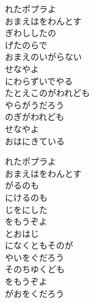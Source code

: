 \documentclass[10pt,b5j]{tarticle} %
\begin{document}
\vspace{1.5em} %
\newcommand{\linespace}{0.5em} %
\newcommand{\blocksize}{0.5\hsize} %
\begin{enumerate} %
    \begin{minipage}[c]{\blocksize}
    
        \vspace{\linespace}
        \item
        れたポプラよ\\
        おまえはをわんとす\\
        ぎわししたの\\
        げたのらで\\
        おまえのいがらない\\
        せなやよ\\
        にわらずいでやる\\
        たとえこのがわれども\\
        やらがうだろう\\
        のぎがわれども\\
        せなやよ\\
        おはにきている
        
        \vspace{\linespace}
        \item
        れたポプラよ\\
        おまえはをわんとす\\
        がるのも\\
        にけるのも\\
        じをにした\\
        をもうぞよ\\
        とおはじ\\
        になくともそのが\\
        やいをぐだろう\\
        そのちゆくども\\
        をもうぞよ\\
        がおをくだろう
        

\end{minipage}
\end{enumerate}
\end{document}
